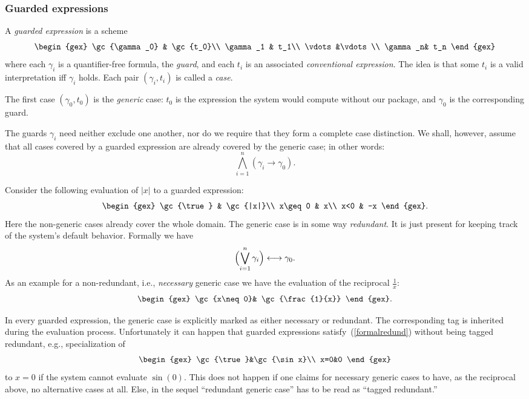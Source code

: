 \subsubsection{Guarded expressions}
A {\em guarded expression} is a scheme
\[
\begin{gex}
\gc{\gamma_0} & \gc{t_0}\\
\gamma_1 & t_1\\
\vdots&\vdots\\
\gamma_n& t_n
\end{gex}
\]
where each $\gamma_i$ is a quantifier-free formula, the {\em guard},
and each $t_i$ is an associated {\em conventional expression}. The
idea is that some $t_i$ is a valid interpretation iff $\gamma_i$
holds. Each pair $(\gamma_i,t_i)$ is called a {\em case}.

The first case $(\gamma_0,t_0)$ is the {\em generic} case: $t_0$ is
the expression the system would compute without our package, and
$\gamma_0$ is the corresponding guard.

The guards $\gamma_i$ need neither exclude one another, nor do we
require that they form a complete case distinction. We shall, however,
assume that all cases covered by a guarded expression are already
covered by the generic case; in other words:
\begin{equation}
\bigwedge_{i=1}^n(\gamma_i\longrightarrow\gamma_0).\label{gencoversall}
\end{equation}

Consider the following evaluation of $|x|$ to a guarded expression:
\[
\begin{gex}
\gc{\true} & \gc{|x|}\\
x\geq0 & x\\
x<0 & -x
\end{gex}.
\]
Here the non-generic cases already cover the whole domain. The
generic case is in some way {\em redundant}. It is just present for
keeping track of the system's default behavior. Formally we have
\begin{equation}
\Bigl(\bigvee_{i=1}^n\gamma_i\Bigr)\longleftrightarrow\gamma_0.
\label{formalredund}
\end{equation}
As an example for a non-redundant, i.e., {\em necessary} generic case
we have the evaluation of the reciprocal $\frac{1}{x}$:
\[
\begin{gex}
\gc{x\neq0}& \gc{\frac{1}{x}}
\end{gex}.
\]

In every guarded expression, the generic case is explicitly marked as
either necessary or redundant. The corresponding tag is inherited
during the evaluation process. Unfortunately it can happen that
guarded expressions satisfy~(\ref{formalredund}) without being tagged
redundant, e.g., specialization of
\[
\begin{gex}
\gc{\true}&\gc{\sin x}\\
x=0&0
\end{gex}
\]
to $x=0$ if the system cannot evaluate $\sin(0)$. This does not happen
if one claims for necessary generic cases to have, as the reciprocal
above, no alternative cases at all. Else, in the sequel ``redundant
generic case'' has to be read as ``tagged redundant.''

